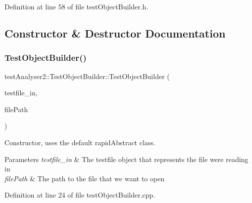 Definition at line 58 of file test\+Object\+Builder.\+h.



\subsection{Constructor \& Destructor Documentation}
\mbox{\label{classtestAnalyser2_1_1TestObjectBuilder_a0b0267e6742ee887c2eaebb74f8b3aae}} 
\subsubsection{\texorpdfstring{TestObjectBuilder()}{TestObjectBuilder()}\hspace{0.1cm}{\footnotesize\ttfamily [1/2]}}
{\footnotesize\ttfamily test\+Analyser2\+::\+Test\+Object\+Builder\+::\+Test\+Object\+Builder (\begin{DoxyParamCaption}\item[{\mbox{\hyperlink{classtestAnalyser2_1_1TestFile}{Test\+File}} \&}]{testfile\+\_\+in,  }\item[{std\+::string}]{file\+Path }\end{DoxyParamCaption})}



Constructor, uses the default rapid\+Abstract class. 


\begin{DoxyParams}{Parameters}
{\em testfile\+\_\+in} & The testfile object that represents the file we\textquotesingle{}re reading in \\
\hline
{\em file\+Path} & The path to the file that we want to open \\
\hline
\end{DoxyParams}


Definition at line 24 of file test\+Object\+Builder.\+cpp.

\mbox{\label{classtestAnalyser2_1_1TestObjectBuilder_a59a0f600c307a437dfe69d42f83868ff}} 
